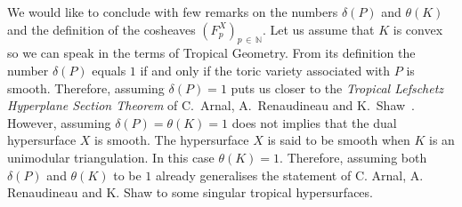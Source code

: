 \documentclass[AHL,Unicode,longabstracts,published]{cedram}
\newcommand{\Z}{\mathbb{Z}}
\newcommand{\N}{\mathbb{N}}
\newcommand{\bbP}{\mathbb{P}}
\DeclareMathOperator{\id}{id}
\begin{document}

We would like to conclude with few remarks on the numbers $\delta(P)$ and $\theta(K)$ and the definition of the cosheaves $(F^{X}_p)_{p\,\in\,\N}$. Let us assume that $K$ is convex so we can speak in the terms of Tropical Geometry. From its definition the number $\delta(P)$ equals $1$ if and only if the toric variety associated with $P$ is smooth. Therefore, assuming $\delta(P)=1$ puts us closer to the \emph{Tropical Lefschetz Hyperplane Section Theorem} of C.~Arnal, A.~Renaudineau and K.~Shaw~\cite[Theorem~1.2 p.~1349]{Arn-Ren-Sha_Lef_sec}.
However, assuming $\delta(P)=\theta(K)=1$ does not implies that the dual hypersurface $X$ is smooth. The hypersurface $X$ is said to be smooth when $K$ is an unimodular triangulation. In this case $\theta(K)=1$. Therefore, assuming both $\delta(P)$ and $\theta(K)$ to be $1$ already generalises the statement of C. Arnal, A. Renaudineau and K. Shaw to some singular tropical hypersurfaces.
\end{document}
